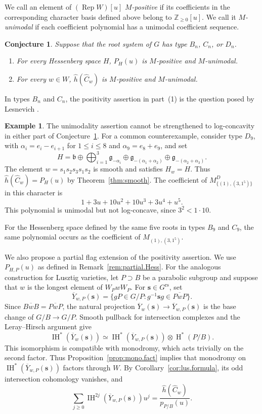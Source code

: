 \documentclass[11pt]{amsart}
\numberwithin{equation}{section}
\newtheorem{conjecture}[theorem]{Conjecture}
\theoremstyle{definition}
\newtheorem{example}[theorem]{Example}
\DeclareMathOperator{\Rep}{\mathrm{Rep}}
\DeclareMathOperator{\coh}{\mathrm{H}}
\def\fg{\mathfrak {g}}
\def\fb{\mathfrak {b}}
\def\Grs{G^{\mathrm{rs}}}
\DeclareMathOperator{\IH}{\mathrm{IH}}
\begin{document}
We call an element of $(\Rep W)[u]$ \emph{$M$-positive} if its coefficients in the corresponding character basis defined above belong to $\mathbb Z_{\geq0}[u]$.
We call it \emph{$M$-unimodal} if each coefficient polynomial has a unimodal coefficient sequence.

\begin{conjecture}\label{conj:classical.positivity}
Suppose that the root system of $G$ has type $B_n$, $C_n$, or $D_n$.
\begin{enumerate}
	\item For every Hessenberg space $H$, $P_H(u)$ is $M$-positive and $M$-unimodal.
	\item For every $w\in W$, $\widehat h(\widehat C_w)$ is $M$-positive and $M$-unimodal.
\end{enumerate}
\end{conjecture}

In types $B_n$ and $C_n$, the positivity assertion in part~(1) is the question posed by Lesnevich \cite[Question~A.4]{Lesnevich}.

\begin{example}\label{ex:M.logconcavity}
The unimodality assertion cannot be strengthened to log-concavity in either part of Conjecture~\ref{conj:classical.positivity}.
For a common counterexample, consider type $D_9$,
with $\alpha_i=e_i-e_{i+1}$ for $1\leq i\leq8$
and $\alpha_9=e_8+e_9$, and set
\[
H=\fb
\oplus\bigoplus_{i=1}^{3}\fg_{-\alpha_i}
\oplus\fg_{-(\alpha_1+\alpha_2)}
\oplus\fg_{-(\alpha_2+\alpha_3)}.
\]
The element $w=s_1s_2s_3s_1s_2$ is smooth and satisfies $H_w=H$.
Thus $\widehat h(\widehat C_w)=P_H(u)$ by
Theorem~\ref{thm:smooth}.
The coefficient of $M^D_{\{(1),(3,1^5)\}}$ in this
character is
\[
1+3u+10u^2+10u^3+3u^4+u^5.
\]
This polynomial is unimodal but not log-concave,
since $3^2<1\cdot10$.

For the Hessenberg space defined by the same five roots
in types $B_9$ and $C_9$, the same polynomial occurs
as the coefficient of $M_{(1),(3,1^5)}$.
\end{example}

We also propose a partial flag extension of the positivity assertion.
We use $P_{H,P}(u)$ as defined in Remark~\ref{rem:partial.Hess}.
For the analogous construction for Lusztig varieties, let $P\supset B$ be a parabolic subgroup and suppose that $w$ is the longest element of $W_PwW_P$.
For $\mathbf s\in\Grs$, set
\[
\overline Y_{w,P}(\mathbf s)
=
\{gP\in G/P:
g^{-1}\mathbf s g\in\overline{PwP}\}.
\]
Since $\overline{BwB}=\overline{PwP}$, the natural projection 
$\overline Y_w(\mathbf s)\to \overline Y_{w,P}(\mathbf s)$
is the base change of $G/B\to G/P$.
Smooth pullback for intersection complexes and the Leray--Hirsch argument give
\[
\IH^*(\overline Y_w(\mathbf s))
\simeq
\IH^*(\overline Y_{w,P}(\mathbf s))
\otimes\coh^*(P/B).
\]
This isomorphism is compatible with monodromy, which acts trivially on the second factor.
Thus Proposition~\ref{prop:mono.fact} implies that monodromy on $\IH^*(\overline Y_{w,P}(\mathbf s))$ factors through $W$.
By Corollary~\ref{cor:lus.formula}, its odd intersection cohomology vanishes, and
\[
\sum_{j\geq0}
\IH^{2j}(\overline Y_{w,P}(\mathbf s))u^j
=
\frac{\widehat h(\widehat C_w)}{p_{P/B}(u)}.
\]
\end{document}
